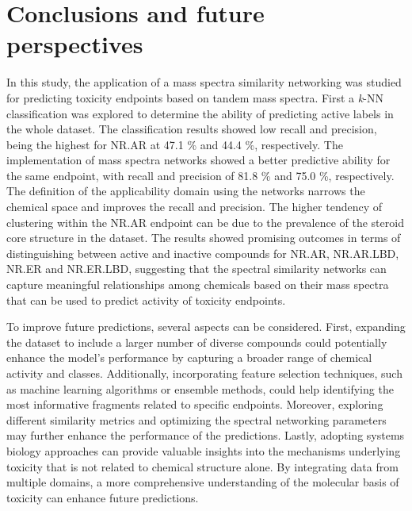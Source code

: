 \chapter{Conclusions and future perspectives}

In this study, the application of a mass spectra similarity networking was studied for predicting toxicity endpoints based on tandem mass spectra. First a \textit{k}-NN classification was explored to determine the ability of predicting active labels in the whole dataset. The classification results showed low recall and precision, being the highest for NR.AR at 47.1 \% and 44.4 \%, respectively. The implementation of mass spectra networks showed a better predictive ability for the same endpoint, with recall and precision of 81.8 \% and 75.0 \%, respectively. The definition of the applicability domain using the networks narrows the chemical space and improves the recall and precision. The higher tendency of clustering within the NR.AR endpoint can be due to the prevalence of the steroid core structure in the dataset. The results showed promising outcomes in terms of distinguishing between active and inactive compounds for NR.AR, NR.AR.LBD, NR.ER and NR.ER.LBD, suggesting that the spectral similarity networks can capture meaningful relationships among chemicals based on their mass spectra that can be used to predict activity of toxicity endpoints. 

To improve future predictions, several aspects can be considered. First, expanding the dataset to include a larger number of diverse compounds could potentially enhance the model's performance by capturing a broader range of chemical activity and classes. Additionally, incorporating feature selection techniques, such as machine learning algorithms or ensemble methods, could help identifying the most informative fragments related to specific endpoints. Moreover, exploring different similarity metrics and optimizing the spectral networking parameters may further enhance the performance of the predictions.  Lastly, adopting systems biology approaches can provide valuable insights into the mechanisms underlying toxicity that is not related to chemical structure alone. By integrating data from multiple domains, a more comprehensive understanding of the molecular basis of toxicity can enhance future predictions.
